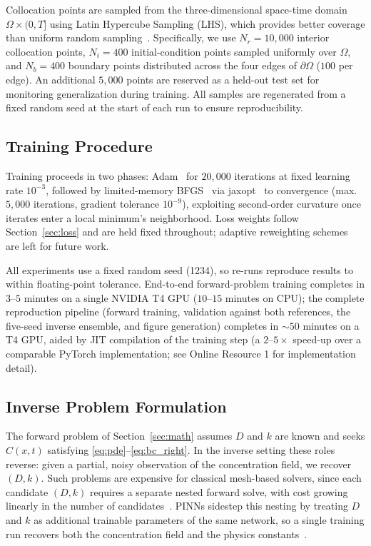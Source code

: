 \documentclass[12pt]{article}
\begin{document}
Collocation points are sampled from the three-dimensional
space-time domain $\Omega \times (0, T]$ using Latin Hypercube
Sampling (LHS), which provides better coverage than uniform
random sampling~\cite{McKay1979}. Specifically, we use
$N_r = 10{,}000$ interior collocation points, $N_i = 400$
initial-condition points sampled uniformly over $\Omega$, and
$N_b = 400$ boundary points distributed across the four edges
of $\partial \Omega$ ($100$ per edge). An additional $5{,}000$
points are reserved as a held-out test set for monitoring
generalization during training. All samples are regenerated
from a fixed random seed at the start of each run to ensure
reproducibility.

\subsection{Training Procedure}
\label{sec:training}

Training proceeds in two phases: Adam~\cite{Kingma2015} for
$20{,}000$ iterations at fixed learning rate $10^{-3}$, followed
by limited-memory BFGS~\cite{Liu1989} via
jaxopt~\cite{Blondel2022} to convergence (max.\ $5{,}000$
iterations, gradient tolerance $10^{-9}$), exploiting
second-order curvature once iterates enter a local minimum's
neighborhood. Loss weights follow Section~\ref{sec:loss} and
are held fixed throughout; adaptive reweighting
schemes~\cite{Wang2021} are left for future work.

All experiments use a fixed random seed (1234), so re-runs
reproduce results to within floating-point tolerance. End-to-end
forward-problem training completes in $3$--$5$ minutes on a
single NVIDIA T4 GPU ($10$--$15$ minutes on CPU); the complete
reproduction pipeline (forward training, validation against both
references, the five-seed inverse ensemble, and figure
generation) completes in $\sim 50$ minutes on a T4 GPU, aided by
JIT compilation of the training step (a $2$--$5\times$
speed-up over a comparable PyTorch implementation; see Online
Resource 1 for implementation detail).

\subsection{Inverse Problem Formulation}
\label{sec:inverse}

The forward problem of Section~\ref{sec:math} assumes $D$ and
$k$ are known and seeks $C(x,t)$ satisfying
\eqref{eq:pde}--\eqref{eq:bc_right}. In the inverse setting
these roles reverse: given a partial, noisy observation of the
concentration field, we recover $(D, k)$. Such problems are
expensive for classical mesh-based solvers, since each candidate
$(D, k)$ requires a separate nested forward solve, with cost
growing linearly in the number of candidates~\cite{Wiencke2020}.
PINNs sidestep this nesting by treating $D$ and $k$ as
additional trainable parameters of the same network, so a
single training run recovers both the concentration field and
the physics constants~\cite{Raissi2019, Haghighat2021}.
\end{document}
